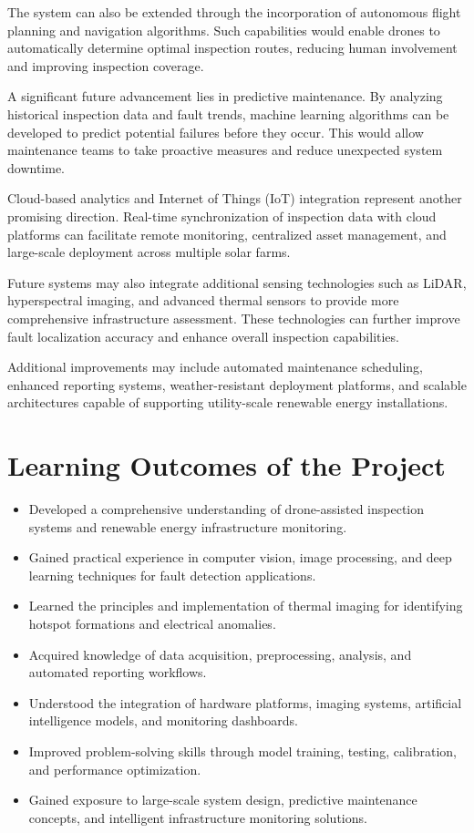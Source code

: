 The system can also be extended through the incorporation of autonomous flight planning and navigation algorithms. Such capabilities would enable drones to automatically determine optimal inspection routes, reducing human involvement and improving inspection coverage.

A significant future advancement lies in predictive maintenance. By analyzing historical inspection data and fault trends, machine learning algorithms can be developed to predict potential failures before they occur. This would allow maintenance teams to take proactive measures and reduce unexpected system downtime.

Cloud-based analytics and Internet of Things (IoT) integration represent another promising direction. Real-time synchronization of inspection data with cloud platforms can facilitate remote monitoring, centralized asset management, and large-scale deployment across multiple solar farms.

Future systems may also integrate additional sensing technologies such as LiDAR, hyperspectral imaging, and advanced thermal sensors to provide more comprehensive infrastructure assessment. These technologies can further improve fault localization accuracy and enhance overall inspection capabilities.

Additional improvements may include automated maintenance scheduling, enhanced reporting systems, weather-resistant deployment platforms, and scalable architectures capable of supporting utility-scale renewable energy installations.

\section{Learning Outcomes of the Project}

\begin{itemize}
\item Developed a comprehensive understanding of drone-assisted inspection systems and renewable energy infrastructure monitoring.
\item Gained practical experience in computer vision, image processing, and deep learning techniques for fault detection applications.
\item Learned the principles and implementation of thermal imaging for identifying hotspot formations and electrical anomalies.
\item Acquired knowledge of data acquisition, preprocessing, analysis, and automated reporting workflows.
\item Understood the integration of hardware platforms, imaging systems, artificial intelligence models, and monitoring dashboards.
\item Improved problem-solving skills through model training, testing, calibration, and performance optimization.
\item Gained exposure to large-scale system design, predictive maintenance concepts, and intelligent infrastructure monitoring solutions.
\end{itemize}
